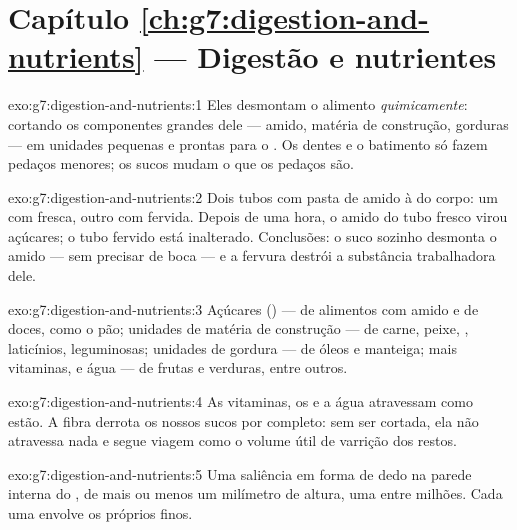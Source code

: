 \section*{Capítulo \ref{ch:g7:digestion-and-nutrients} --- Digestão e nutrientes}

\begin{solution}{exo:g7:digestion-and-nutrients:1}
Eles desmontam o alimento \emph{quimicamente}: cortando os componentes
grandes dele --- amido, matéria de construção, gorduras --- em unidades
pequenas e prontas para o . Os dentes e o batimento só fazem
pedaços menores; os sucos mudam o que os pedaços são.
\end{solution}

\begin{solution}{exo:g7:digestion-and-nutrients:2}
Dois tubos com pasta de amido à  do corpo: um com 
fresca, outro com  fervida. Depois de uma hora, o amido do tubo
fresco virou açúcares; o tubo fervido está inalterado. Conclusões: o
suco sozinho desmonta o amido --- sem precisar de boca --- e a fervura
destrói a substância trabalhadora dele.
\end{solution}

\begin{solution}{exo:g7:digestion-and-nutrients:3}
Açúcares () --- de alimentos com amido e de doces, como o pão;
unidades de matéria de construção --- de carne, peixe, ,
laticínios, leguminosas; unidades de gordura --- de óleos e manteiga;
mais vitaminas,  e água --- de frutas e verduras, entre
outros.
\end{solution}

\begin{solution}{exo:g7:digestion-and-nutrients:4}
As vitaminas, os  e a água atravessam como estão. A fibra
derrota os nossos sucos por completo: sem ser cortada, ela não
atravessa nada e segue viagem como o volume útil de varrição dos
restos.
\end{solution}

\begin{solution}{exo:g7:digestion-and-nutrients:5}
Uma saliência em forma de dedo na parede interna do ,
de mais ou menos um milímetro de altura, uma entre milhões. Cada uma
envolve os próprios  finos.
\end{solution}

